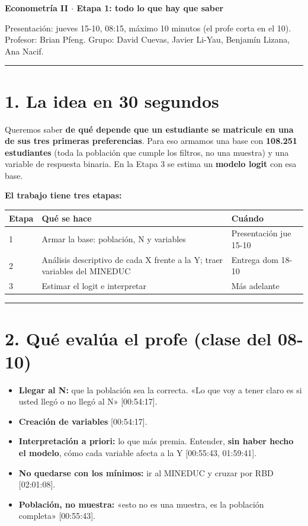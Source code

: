 \documentclass[11pt]{article}
\begin{document}
{\LARGE\bfseries Econometría II $\cdot$ Etapa 1: todo lo que hay que saber\par}\medskip

Presentación: jueves 15-10, 08:15, máximo 10 minutos (el profe corta en el 10). Profesor: Brian Pfeng. Grupo: David Cuevas, Javier Li-Yau, Benjamín Lizana, Ana Nacif.\par

\medskip\hrule\medskip

\section*{1. La idea en 30 segundos}

Queremos saber \textbf{de qué depende que un estudiante se matricule en una de sus tres primeras preferencias}. Para eso armamos una base con \textbf{108.251 estudiantes} (toda la población que cumple los filtros, no una muestra) y una variable de respuesta binaria. En la Etapa 3 se estima un \textbf{modelo logit} con esa base.\par

\textbf{El trabajo tiene tres etapas:}\par

\begin{tabularx}{\linewidth}{lXl}\toprule
\textbf{Etapa} & \textbf{Qué se hace} & \textbf{Cuándo}\\ \midrule
1 & Armar la base: población, N y variables & Presentación jue 15-10\\
2 & Análisis descriptivo de cada X frente a la Y; traer variables del MINEDUC & Entrega dom 18-10\\
3 & Estimar el logit e interpretar & Más adelante\\
\bottomrule\end{tabularx}\medskip

\medskip\hrule\medskip

\section*{2. Qué evalúa el profe (clase del 08-10)}

\begin{itemize}
\item \textbf{Llegar al N:} que la población sea la correcta. «Lo que voy a tener claro es si usted llegó o no llegó al N» [00:54:17].
\item \textbf{Creación de variables} [00:54:17].
\item \textbf{Interpretación a priori:} lo que más premia. Entender, \textbf{sin haber hecho el modelo}, cómo cada variable afecta a la Y [00:55:43, 01:59:41].
\item \textbf{No quedarse con los mínimos:} ir al MINEDUC y cruzar por RBD [02:01:08].
\item \textbf{Población, no muestra:} «esto no es una muestra, es la población completa» [00:55:43].
\end{itemize}
\end{document}
